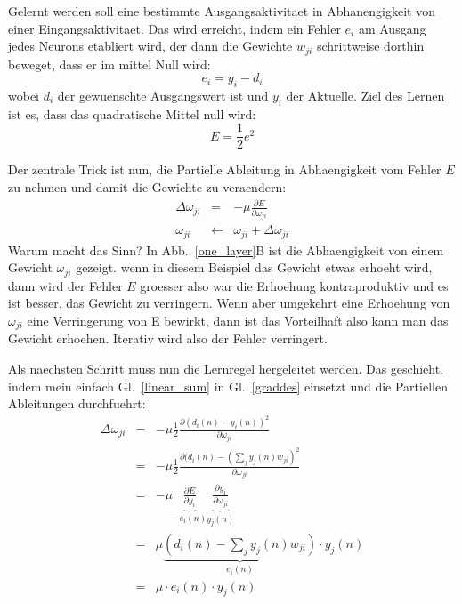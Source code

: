 \documentclass[12pt]{article}
\begin{document}
Gelernt werden soll eine bestimmte Ausgangsaktivitaet in Abhanengigkeit von einer Eingangsaktivitaet.
Das wird erreicht, indem ein Fehler $e_i$ am Ausgang jedes Neurons etabliert wird, der dann die Gewichte $w_{ji}$
schrittweise dorthin beweget, dass er im mittel Null wird:
\begin{equation}
  e_i = y_i - d_i \label{output_error}
\end{equation}
wobei $d_i$ der gewuenschte Ausgangswert ist und $y_i$ der Aktuelle.
Ziel des Lernen ist es, dass das quadratische Mittel null wird:
\begin{equation}
  E = \frac{1}{2} e^2
\end{equation}

Der zentrale Trick ist nun, die Partielle Ableitung in Abhaengigkeit vom Fehler $E$ zu nehmen
und damit die Gewichte zu veraendern:
\begin{eqnarray}
  \Delta\omega_{ji} & = & - \mu \frac{\partial E}{\partial \omega_{ji}} \label{graddes} \\
  \omega_{ji} & \leftarrow & \omega_{ji} + \Delta\omega_{ji}
\end{eqnarray}
Warum macht das Sinn? In Abb.~\ref{one_layer}B ist die Abhaengigkeit von einem Gewicht
$\omega_{ji}$ gezeigt. wenn in diesem Beispiel das Gewicht etwas erhoeht wird, dann
wird der Fehler $E$ groesser also war die Erhoehung kontraproduktiv und es ist besser,
das Gewicht zu verringern. Wenn aber umgekehrt eine Erhoehung von $\omega_{ji}$ eine
Verringerung von E bewirkt, dann ist das Vorteilhaft also kann man das Gewicht erhoehen.
Iterativ wird also der Fehler verringert.

Als naechsten Schritt muss nun die Lernregel hergeleitet werden. Das geschieht, indem
mein einfach Gl.~\ref{linear_sum} in Gl.~\ref{graddes} einsetzt und die Partiellen Ableitungen
durchfuehrt:
\begin{eqnarray}
  \Delta\omega_{ji}
   & = & - \mu \frac{1}{2} \frac{\partial ( d_i(n) - y_i(n) )^2 }{\partial \omega_{ji}} \\
   & = & - \mu \frac{1}{2} \frac{\partial ( d_i(n) - \left( \sum_j y_j(n) w_{ji} \right)^2 }{\partial \omega_{ji}} \\
   & = & - \mu \underbrace{\frac{\partial E}{\partial y_i}}_{-e_i(n)} \underbrace{\frac{\partial y_i}{\partial \omega_{ji}}}_{y_j(n)} \label{chainrule}\\
  & = & \mu \underbrace{\left(d_i(n) - \sum_j y_j(n) w_{ji}\right)}_{e_i(n)} \cdot y_j(n) \\
  & = & \mu \cdot e_i(n) \cdot y_j(n)
\end{eqnarray}
\end{document}
